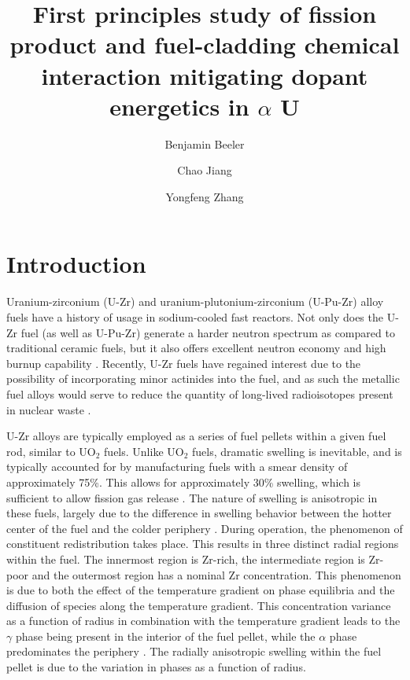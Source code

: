 \documentclass[review]{elsarticle}
\begin{document}
\begin{frontmatter}
\title{First principles study of fission product and fuel-cladding chemical interaction mitigating dopant energetics in $\alpha$ U}

\author[inl]{Benjamin Beeler}
\author[inl]{Chao Jiang}
\author[inl]{Yongfeng Zhang}
\address[inl]{Idaho National Laboratory, Idaho Falls, ID 83415}

\begin{abstract}

\end{abstract}
\end{frontmatter}

\linenumbers

\section{Introduction}
Uranium-zirconium (U-Zr) and uranium-plutonium-zirconium (U-Pu-Zr) alloy fuels have a history of usage in sodium-cooled fast reactors. Not only does the U-Zr fuel (as well as U-Pu-Zr) generate a harder neutron spectrum as compared to traditional ceramic fuels, but it also offers excellent neutron economy and high burnup capability \cite{hofman1997}. Recently, U-Zr fuels have regained interest due to the possibility of incorporating minor actinides into the fuel, and as such the metallic fuel alloys would serve to reduce the quantity of long-lived radioisotopes present in nuclear waste \cite{capriotti2017}. 

U-Zr alloys are typically employed as a series of fuel pellets within a given fuel rod, similar to UO$_{2}$ fuels. Unlike UO$_{2}$ fuels, dramatic swelling is inevitable, and is typically accounted for by manufacturing fuels with a smear density of approximately 75{\%}. This allows for approximately 30\% swelling, which is sufficient to allow fission gas release \cite{beck1968}. The nature of swelling is anisotropic in these fuels, largely due to the difference in swelling behavior between the hotter center of the fuel and the colder periphery \cite{hofman1990}. During operation, the phenomenon of constituent redistribution takes place. This results in three distinct radial regions within the fuel. The innermost region is Zr-rich, the intermediate region is Zr-poor and the outermost region has a nominal Zr concentration. This phenomenon is due to both the effect of the temperature gradient on phase equilibria and the diffusion of species along the temperature gradient. This concentration variance as a function of radius in combination with the temperature gradient leads to the $\gamma$ phase being present in the interior of the fuel pellet, while the $\alpha$ phase predominates the periphery \cite{kobayashi1990, kim2004}. The radially anisotropic swelling within the fuel pellet is due to the variation in phases as a function of radius.
\end{document}
